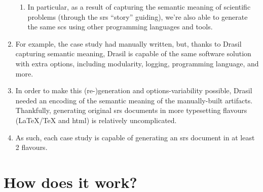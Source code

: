 \begin{enumerate}
            \begin{enumerate}
                  \item In particular, as a result of capturing the semantic
                        meaning of scientific problems (through the \acs{srs}
                        ``story'' guiding), we're also able to generate the same
                        \acs{scs} using other programming languages and tools.
            \end{enumerate}

      \item For example, the  case study had 
            manually written, but, thanks to Drasil capturing semantic meaning,
            Drasil is capable of
            the same software solution with extra options, including modularity,
            logging, programming language, and more.

      \item In order to make this (re-)generation and options-variability
            possible, Drasil needed an encoding of the semantic meaning of the
            manually-built artifacts. Thankfully, generating original \acs{srs}
            documents in more typesetting flavours (\LaTeX{}/\TeX{} and
            \acs{html}) is relatively uncomplicated.

      \item As such, each case study is capable of generating an \acs{srs}
            document in at least 2 flavours.

\end{enumerate}

\caseStudiesTable{}












\section{How does it work?}
\label{chap:drasil:sec:how-does-it-work}


